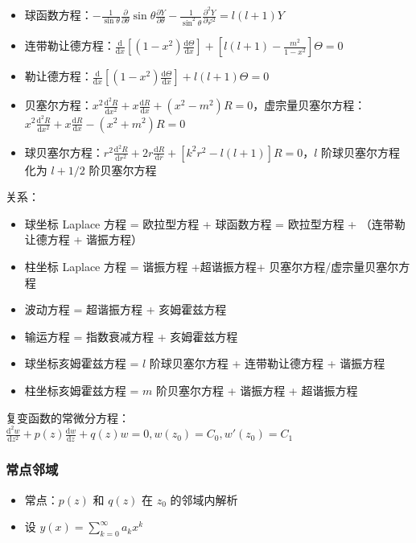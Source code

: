 \documentclass{article}
\begin{document}
\begin{itemize}
    \item 球函数方程：$-{\frac {1}{\sin \theta }}{\frac {\partial }{\partial \theta }}\sin \theta {\frac {\partial Y}{\partial \theta }}-{\frac {1}{\sin ^{2}\theta }}{\frac {\partial ^{2}Y}{\partial \varphi ^{2}}}=l(l+1)Y$
    \item 连带勒让德方程：$\frac{\mathrm{d}}{\mathrm{d}x}[(1-x^2)\frac{\mathrm{d}\Theta}{\mathrm{d}x}]+[l(l+1)-\frac{m^2}{1-x^2}]\Theta=0$
    \item 勒让德方程：$\frac{\mathrm{d}}{\mathrm{d}x}[(1-x^2)\frac{\mathrm{d}\Theta}{\mathrm{d}x}]+l(l+1)\Theta=0$
    \item 贝塞尔方程：$x^2\frac{\mathrm{d}^2R}{\mathrm{d}x^2}+x\frac{\mathrm{d}R}{\mathrm{d}x}+(x^2-m^2)R=0$，虚宗量贝塞尔方程：$x^2\frac{\mathrm{d}^2R}{\mathrm{d}x^2}+x\frac{\mathrm{d}R}{\mathrm{d}x}-(x^2+m^2)R=0$
    \item 球贝塞尔方程：$r^2\frac{\mathrm{d}^2R}{\mathrm{d}r^2}+2r\frac{\mathrm{d}R}{\mathrm{d}r}+[k^2r^2-l(l+1)]R=0$，$l$ 阶球贝塞尔方程化为 $l+1/2$ 阶贝塞尔方程
\end{itemize}
关系：
\begin{itemize}
    \item 球坐标 Laplace 方程 = 欧拉型方程 + 球函数方程 = 欧拉型方程 + （连带勒让德方程 + 谐振方程）
    \item 柱坐标 Laplace 方程 = 谐振方程 +超谐振方程+ 贝塞尔方程/虚宗量贝塞尔方程
    \item 波动方程 = 超谐振方程 + 亥姆霍兹方程
    \item 输运方程 = 指数衰减方程 + 亥姆霍兹方程
    \item 球坐标亥姆霍兹方程 = $l$ 阶球贝塞尔方程 + 连带勒让德方程 + 谐振方程
    \item 柱坐标亥姆霍兹方程 = $m$ 阶贝塞尔方程 + 谐振方程 + 超谐振方程
\end{itemize}
复变函数的常微分方程：$\frac{\mathrm{d}^2w}{\mathrm{d}z^2}+p(z)\frac{\mathrm{d}w}{\mathrm{d}z}+q(z)w=0, w(z_0)=C_0, w'(z_0)=C_1$

\subsubsection{常点邻域}

\begin{itemize}
    \item 常点：$p(z)$ 和 $q(z)$ 在 $z_0$ 的邻域内解析
    \item 设 $y(x)=\sum^\infty_{k=0}a_kx^k$
\end{itemize}
\end{document}
